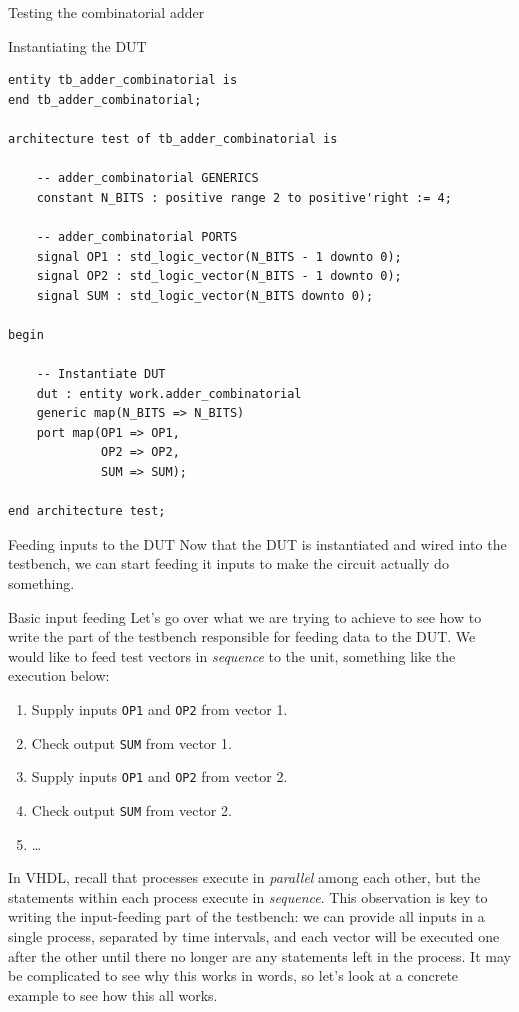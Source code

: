 \documentclass[lab]{course}
\begin{document}
\begin{section}{Testing the combinatorial adder}
\begin{subsection}{Instantiating the DUT}
\begin{lstlisting}[caption={Instantiate DUT}, captionpos=b, label={lst:combinatorial_instantiate_dut}]
entity tb_adder_combinatorial is
end tb_adder_combinatorial;

architecture test of tb_adder_combinatorial is

    -- adder_combinatorial GENERICS
    constant N_BITS : positive range 2 to positive'right := 4;

    -- adder_combinatorial PORTS
    signal OP1 : std_logic_vector(N_BITS - 1 downto 0);
    signal OP2 : std_logic_vector(N_BITS - 1 downto 0);
    signal SUM : std_logic_vector(N_BITS downto 0);

begin

    -- Instantiate DUT
    dut : entity work.adder_combinatorial
    generic map(N_BITS => N_BITS)
    port map(OP1 => OP1,
             OP2 => OP2,
             SUM => SUM);

end architecture test;
        \end{lstlisting}
    \end{subsection}

    \clearpage

    \begin{subsection}{Feeding inputs to the DUT}
        Now that the DUT is instantiated and wired into the testbench, we can start feeding it inputs to make the circuit actually do something.

        \begin{subsubsection}{Basic input feeding}
            \label{sec:combinatorial_basic_input_feeding}
            Let's go over what we are trying to achieve to see how to write the part of the testbench responsible for feeding data to the DUT. We would like to feed test vectors in \emph{sequence} to the unit, something like the execution below:

            \begin{enumerate}
                \item Supply inputs \verb+OP1+ and \verb+OP2+ from vector 1.
                \item Check output \verb+SUM+ from vector 1.
                \item Supply inputs \verb+OP1+ and \verb+OP2+ from vector 2.
                \item Check output \verb+SUM+ from vector 2.
                \item \ldots
            \end{enumerate}

            In VHDL, recall that processes execute in \emph{parallel} among each other, but the statements within each process execute in \emph{sequence}. This observation is key to writing the input-feeding part of the testbench: we can provide all inputs in a single process, separated by time intervals, and each vector will be executed one after the other until there no longer are any statements left in the process. It may be complicated to see why this works in words, so let's look at a concrete example to see how this all works.


\end{subsubsection}
\end{subsection}
\end{section}
\end{document}
